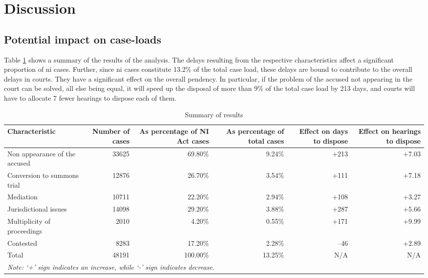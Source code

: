 \section{Discussion}

\subsection{Potential impact on case-loads} \label{sec:impact-case-loads}

Table \ref{tab:summary_results} shows a summary of the results of the analysis. The delays resulting from the respective characteristics affect a significant proportion of \gls{ni} cases. Further, since \gls{ni} cases constitute 13.2\% of the total case load, these delays are bound to contribute to the overall delays in courts. They have a significant effect on the overall pendency. In particular, if the problem of the accused not appearing in the court can be solved, all else being equal, it will speed up the disposal of more than 9\% of the total case load by 213 days, and courts will have to allocate 7 fewer hearings to dispose each of them.

{\footnotesize \begin{longtable}{@{}p{2.5cm}rrrrr}
 \caption{Summary of results}\label{tab:summary_results}\\
 \toprule
 \textbf{Characteristic} & \multicolumn{1}{p{2cm}}{\textbf{Number of cases}} &
 \multicolumn{1}{p{2cm}}{\textbf{As percentage of NI Act cases}}
 & \multicolumn{1}{p{2cm}}{\textbf{As percentage of total cases}}
 & \multicolumn{1}{p{2cm}}{\textbf{Effect on days to dispose}} &
 \multicolumn{1}{p{2cm}}{\textbf{Effect on hearings to dispose}}
 \\
 \midrule
 Non appearance of the accused & 33625 & 69.80\% & 9.24\% & +213 & +7.03 \\ \midrule
 Conversion to summons trial & 12876 & 26.70\% & 3.54\% & +111 & +7.18 \\ \midrule
 Mediation & 10711 & 22.20\% & 2.94\% & +108 & +3.27 \\ \midrule
 Jurisdictional issues & 14098 & 29.20\% & 3.88\% & +287 & +5.66 \\ \midrule
 Multiplicity of proceedings & 2010 & 4.20\% & 0.55\% & +171 & +9.99 \\ \midrule
 Contested & 8283 & 17.20\% & 2.28\% & --46 & +2.89 \\ \midrule
 Total & 48191 & 100.00\% & 13.25\% & N/A & N/A \\
 \bottomrule
 \multicolumn{6}{l}{{\footnotesize \emph{Note: `+' sign
  indicates an increase, while `-' sign indicates decrease.}}}\\
\end{longtable}
}

